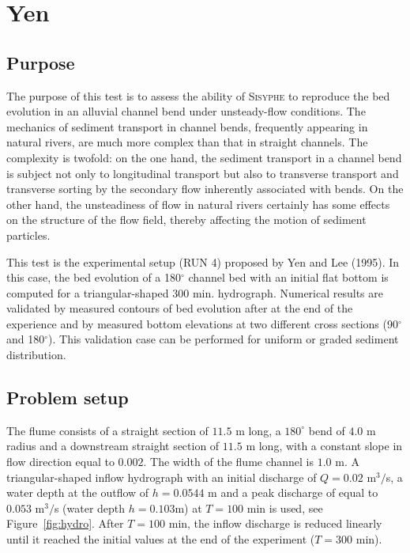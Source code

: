 \chapter{Yen}
%

%
\section{Purpose}
%
The purpose of this test is to assess the ability of \textsc{Sisyphe} to reproduce the bed evolution in an alluvial channel bend under unsteady-flow conditions. 
The mechanics of sediment transport in channel bends, frequently appearing in natural rivers, are much more complex than that in straight channels. 
The complexity is twofold: on the one hand, the sediment transport in a channel bend is subject not only to longitudinal transport 
but also to transverse transport and transverse sorting by the secondary flow inherently associated with bends. 
On the other hand, the unsteadiness of flow in natural rivers certainly has some effects on the structure of the flow field, thereby affecting the motion of sediment particles.

This test is the experimental setup (RUN 4) proposed by Yen and Lee (1995). In
this case, the bed evolution of a 180$^{\circ}$ channel bed with an initial
flat bottom is computed for a triangular-shaped $300$ min. hydrograph.
Numerical results are validated by measured contours of bed evolution after at
the end of the experience and by measured bottom elevations at two different
cross sections (90$^{\circ}$ and 180$^{\circ}$). This validation case can be
performed for uniform or graded sediment distribution.
%
\section{Problem setup}
%
The flume consists of a straight section of $11.5$ m long, a $180^{\circ}$ bend of $4.0$ m radius and a downstream straight section of
$11.5$ m long, with a constant slope in flow direction equal to $0.002$. The width of the flume channel is $1.0$ m. A triangular-shaped inflow hydrograph with an initial discharge of $Q=0.02$ m$^3/$s, a water depth at the outflow of $h = 0.0544$ m and a peak discharge of equal to $0.053$ m$^3/$s (water depth $h=0.103$m) at $T = 100$ min
is used, see Figure~\ref{fig:hydro}. After $T = 100$ min, the inflow discharge is reduced linearly until it reached the initial values at the end of the experiment ($T = 300$ min).

